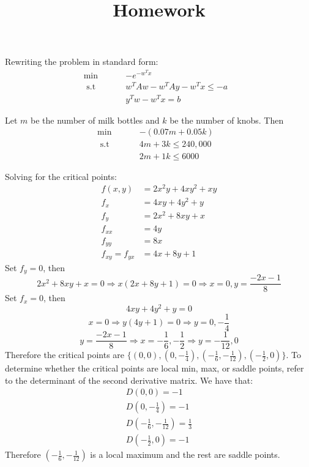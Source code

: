 \documentclass[12pt]{article}
\title{Homework}
\newenvironment{problem}[2][Problem]{\begin{trivlist}
\item[\hskip \labelsep {\bfseries #1}\hskip \labelsep {\bfseries #2}]}{\end{trivlist}}
\begin{document}
\begin{problem}{1.}
Rewriting the problem in standard form: 
\begin{align*}
\min \hspace{1cm} & - e^{-w^Tx} &\\
 \text{ s.t } \hspace{1cm}  & w^TAw -w^TAy - w^Tx \leq -a& \\
&y^Tw - w^Tx = b&
\end{align*}
\end{problem}

\begin{problem}{5.}
Let $m$ be the number of milk bottles and $k$ be the number of knobs. Then 
\begin{align*}
\min \hspace{1cm} & - (0.07m + 0.05k)&\\
 \text{ s.t } \hspace{1cm}  &4m +3k  \leq 240,000 & \\
& 2m +1 k\leq 6000 &
\end{align*}
\end{problem}


\begin{problem}{6.} 
Solving for the critical points: 
\begin{align*}
f(x,y)  &= 2x^2y + 4xy^2 + xy\\
f_x &= 4xy + 4y^2 + y \\
f_y &= 2x^2 + 8xy +x\\
f_{xx} & = 4y \\
f_{yy} & = 8x \\
f_{xy} = f_{yx} &= 4x + 8y + 1
\end{align*}
Set $f_y = 0$, then 
$$ 2x^2 + 8xy +x = 0 \Rightarrow x(2x + 8y + 1) = 0 \Rightarrow x = 0, y = \frac{-2x -1}{8} $$
Set $f_x = 0$, then 
$$4xy + 4y^2 + y  = 0 $$
$$x = 0 \Rightarrow y(4y + 1) = 0 \Rightarrow y = 0, -\frac{1}{4}$$ 
$$y = \frac{-2x -1}{8} \Rightarrow  x = -\frac{1}{6}, -\frac{1}{2} \Rightarrow y = -\frac{1}{12}, 0$$
Therefore the critical points are $\{(0,0), (0,-\frac{1}{4}), (-\frac{1}{6}, -\frac{1}{12}), (-\frac{1}{2},0)\}$. To determine whether the critical points are local min, max, or saddle points, refer to the determinant of the second derivative matrix. We have that:
\begin{align*}
D(0,0) = -1 \\
D(0,-\frac{1}{4}) = -1\\
D(-\frac{1}{6}, -\frac{1}{12}) = \frac{1}{3}\\
D(-\frac{1}{2},0) = -1
\end{align*}
Therefore $(-\frac{1}{6}, -\frac{1}{12})$ is a local maximum and the rest are saddle points. 
\end{problem}
\end{document}
